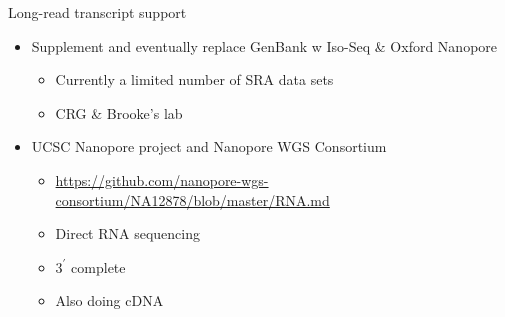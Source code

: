 \documentclass[10pt,
               hyperref={bookmarks=false,
                         bookmarksopen=false,
                         colorlinks=true,
                         linkcolor=blue,
                         urlcolor=blue},
               xcolor={svgnames,table}]{beamer}
\newenvironment{tightitemize}{%
\begin{itemize}
  \setlength{\itemsep}{1pt}%
  \setlength{\parskip}{0pt}%
  \setlength{\parsep}{0pt}%
}{\end{itemize}}
\begin{document}
\begin{frame}{Long-read transcript support}
  \begin{itemize}
  \item Supplement and eventually replace GenBank w Iso-Seq \& Oxford Nanopore
    \begin{tightitemize}
    \item Currently a limited number of SRA data sets
    \item CRG \& Brooke's lab
    \end{tightitemize}
  \item UCSC Nanopore project and Nanopore WGS Consortium
    \begin{tightitemize}
    \item \url{https://github.com/nanopore-wgs-consortium/NA12878/blob/master/RNA.md}
    \item Direct RNA sequencing
    \item $3^\prime$ complete
    \item Also doing cDNA
    \end{tightitemize}
  \end{itemize}
\end{frame}
\end{document}
